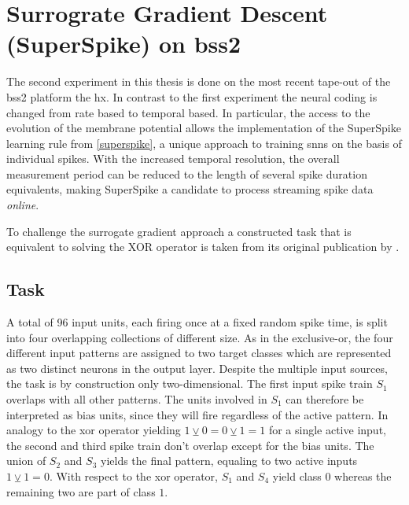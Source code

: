 \chapter{Surrograte Gradient Descent (SuperSpike) on \acrshort{bss2}}

The second experiment in this thesis is done on the most recent tape-out of the \gls{bss2} platform the \gls{hx}. In contrast to the first experiment the neural coding is changed from rate based to temporal based. In particular, the access to the evolution of the membrane potential allows the implementation of the SuperSpike learning rule from \cref{superspike}, a unique approach to training \glspl{snn} on the basis of individual spikes. With the increased temporal resolution, the overall measurement period can be reduced to the length of several spike duration equivalents, making SuperSpike a candidate to process streaming spike data \emph{online}.

To challenge the surrogate gradient approach a constructed task that is equivalent to solving the XOR operator is taken from its original publication by \cite{zenke2018superspike}.

\section{Task}

A total of 96 input units, each firing once at a fixed random spike time, is split into four overlapping collections of different size. As in the exclusive-or, the four different input patterns are assigned to two target classes which are represented as two distinct neurons in the output layer. Despite the multiple input sources, the task is by construction only two-dimensional. The first input spike train $S_1$ overlaps with all other patterns. The units involved in $S_1$ can therefore be interpreted as bias units, since they will fire regardless of the active pattern. In analogy to the xor operator yielding $1 \veebar 0 = 0 \veebar 1 = 1$ for a single active input, the second and third spike train don't overlap except for the bias units. The union of $S_2$ and $S_3$ yields the final pattern, equaling to two active inputs $1 \veebar 1 = 0$. With respect to the xor operator, $S_1$ and $S_4$ yield class $0$ whereas the remaining two are part of class $1$. 

